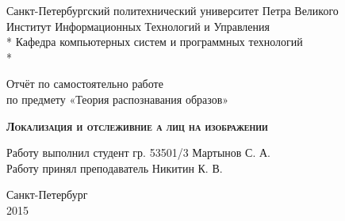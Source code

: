 \begin{titlepage}
\thispagestyle{empty}

\begin{center}
Санкт-Петербургский политехнический университет Петра Великого\\
Институт Информационных Технологий и Управления \\*
Кафедра компьютерных систем и программных технологий \\*
\hrulefill
\end{center}

\vspace{10em}

\begin{center}
\Large Отчёт по самостоятельно работе\\по предмету «Теория распознавания образов» \\
\end{center}

\vspace{1em}

\begin{center}
\textsc{\textbf{Локализация и отслеживние а лиц на изображении}}
\end{center}

\vspace{16em}

\begin{flushleft}
Работу выполнил студент гр. 53501/3 \hrulefill Мартынов С. А. \\
\vspace{1.5em}
Работу принял преподаватель \hrulefill Никитин К. В. \\
\end{flushleft}

\vspace{\fill}

\begin{center}
Санкт-Петербург \\
2015
\end{center}

\end{titlepage}
\setcounter{page}{2}